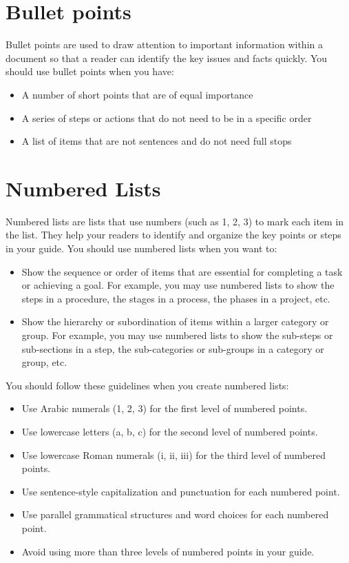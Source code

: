 \documentclass[12pt]{article}
\begin{document}
\pagebreak

\section{Bullet points}

Bullet points are used to draw attention to important information within a document so that a reader can identify the key issues and facts quickly. You should use bullet points when you have:

\begin{itemize}
    \item A number of short points that are of equal importance
    \item A series of steps or actions that do not need to be in a specific order
    \item A list of items that are not sentences and do not need full stops
\end{itemize}

\section{Numbered Lists}

Numbered lists are lists that use numbers (such as 1, 2, 3) to mark each item in the list. They help your readers to identify and organize the key points or steps in your guide. You should use numbered lists when you want to:

\begin{itemize}
    \item Show the sequence or order of items that are essential for completing a task or achieving a goal. For example, you may use numbered lists to show the steps in a procedure, the stages in a process, the phases in a project, etc.
    \item Show the hierarchy or subordination of items within a larger category or group. For example, you may use numbered lists to show the sub-steps or sub-sections in a step, the sub-categories or sub-groups in a category or group, etc.
\end{itemize}

You should follow these guidelines when you create numbered lists:

\begin{itemize}
    \item Use Arabic numerals (1, 2, 3) for the first level of numbered points.
    \item Use lowercase letters (a, b, c) for the second level of numbered points.
    \item Use lowercase Roman numerals (i, ii, iii) for the third level of numbered points.
    \item Use sentence-style capitalization and punctuation for each numbered point.
    \item Use parallel grammatical structures and word choices for each numbered point.
    \item Avoid using more than three levels of numbered points in your guide.
\end{itemize}
\end{document}
